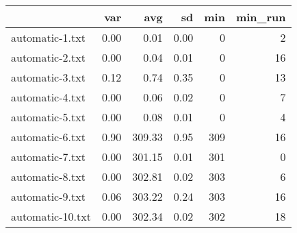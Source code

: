 \begin{tabular}{lrrrrr}
  \toprule  & var & avg & sd & min & min\_run \\ 
  \midrule automatic-1.txt & 0.00 & 0.01 & 0.00 & 0 & 2 \\ 
  automatic-2.txt & 0.00 & 0.04 & 0.01 & 0 & 16 \\ 
  automatic-3.txt & 0.12 & 0.74 & 0.35 & 0 & 13 \\ 
  automatic-4.txt & 0.00 & 0.06 & 0.02 & 0 & 7 \\ 
  automatic-5.txt & 0.00 & 0.08 & 0.01 & 0 & 4 \\ 
  automatic-6.txt & 0.90 & 309.33 & 0.95 & 309 & 16 \\ 
  automatic-7.txt & 0.00 & 301.15 & 0.01 & 301 & 0 \\ 
  automatic-8.txt & 0.00 & 302.81 & 0.02 & 303 & 6 \\ 
  automatic-9.txt & 0.06 & 303.22 & 0.24 & 303 & 16 \\ 
  automatic-10.txt & 0.00 & 302.34 & 0.02 & 302 & 18 \\ 
   \bottomrule \end{tabular}
